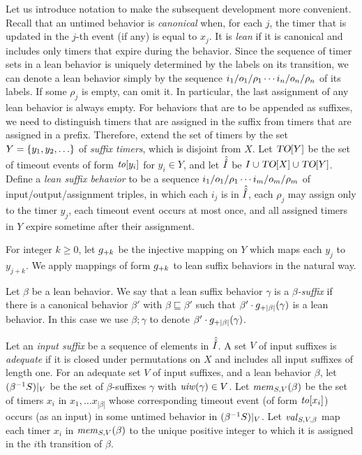 Let us introduce notation to make the subsequent development more convenient. 
Recall that an untimed behavior is \emph{canonical} when, for each $j$,
the timer that is updated in the $j$-th event (if any) is equal to $x_j$.
It is {\em lean} if it is canonical and
includes only timers that expire during the behavior. 
Since the sequence of timer sets in a lean behavior is
uniquely determined by the labels on its transition, we can
denote a lean behavior simply by the sequence
$i_1/o_1/\rho_1 \cdots i_n/o_n/\rho_n$ of its labels.
If some $\rho_j$ is empty, can omit it. In particular, the last assignment of
any lean behavior is always empty.
For behaviors that are to be appended as suffixes, we need to distinguish
timers that are assigned in the suffix from timers that are assigned in a prefix.
Therefore, extend the set of timers by the set $Y = \lbrace y_1,y_2,\ldots\rbrace$ of
{\em suffix timers}, which is disjoint from $X$.
Let $\mbox{\sl TO}[Y]$ be the set of timeout events of form
$\mathit{to}[y_i]$ for $y_i \in Y$, and let
$\hat{\hat{I}}$ be $I \cup \mbox{\sl TO}[X] \cup \mbox{\sl TO}[Y]$.
Define a {\em lean suffix behavior} to be a sequence
$i_1/o_1/\rho_1 \cdots i_m/o_m/\rho_m$ of input/output/assignment triples,
in which each $i_j$ is in $\hat{\hat{I}}$, 
each $\rho_j$ may assign only to the timer $y_j$,
each timeout event occurs at most once,
and all assigned timers in $Y$ expire sometime after their assignment.

For integer $k \geq 0$, let $g_{+{k}}$ be the injective mapping on
$Y$ which maps each $y_j$ to $y_{j+k}$.  We apply mappings of form
$g_{+{k}}$ to lean suffix behaviors in the natural way.

Let $\beta$ be a lean behavior. We say that 
a lean suffix behavior $\gamma$ is a {\em $\beta$-suffix} if
there is a canonical behavior $\beta'$ with $\beta \sqsubseteq \beta'$ such that
$\beta'\cdot g_{+{|\beta|}}(\gamma)$ is a lean behavior. In this case we
use $\beta;\gamma$ to denote $\beta'\cdot g_{+{|\beta|}}(\gamma)$.

Let an {\em input suffix} be a sequence of elements in $\hat{\hat{I}}$.
A set $V$ of input suffixes is {\em adequate} if it is closed under permutations
on $X$ and includes all input suffixes of length one.
For an adequate set $V$ of input suffixes, and a lean behavior $\beta$,
let $({\beta}^{-1}{S})|_{V}$ be the set of $\beta$-suffixes $\gamma$
with $\mathit{uiw}(\gamma) \in V$.
Let $\mathit{mem}_{S,V}(\beta)$ be the set of timers $x_i$ in
$x_1 , \ldots x_{|\beta|}$ whose corresponding timeout event
(of form $\mathit{to}[x_i]$) occurs (as an input) in some untimed behavior in
$({\beta}^{-1}{S})|_{V}$.
Let $\mathit{val}_{S,V,\beta}$ map each timer $x_i$ in
$\mathit{mem}_{S,V}(\beta)$ to the unique positive integer to which it
is assigned in the $i$th transition of $\beta$.


